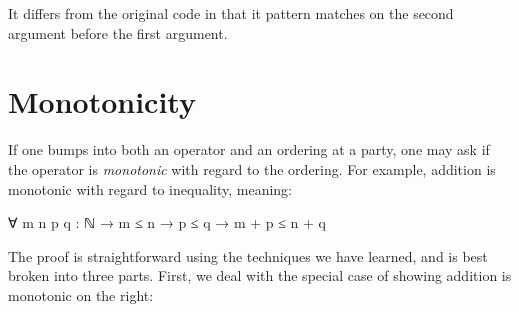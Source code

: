 It differs from the original code in that it pattern matches on the
second argument before the first argument.

\hypertarget{monotonicity}{%
\section{Monotonicity}\label{monotonicity}}

If one bumps into both an operator and an ordering at a party, one may
ask if the operator is \emph{monotonic} with regard to the ordering. For
example, addition is monotonic with regard to inequality, meaning:

\begin{myDisplay}
∀ {m n p q : ℕ} → m ≤ n → p ≤ q → m + p ≤ n + q
\end{myDisplay}

The proof is straightforward using the techniques we have learned, and
is best broken into three parts. First, we deal with the special case of
showing addition is monotonic on the right:

\begin{fence}
\begin{code}%
\>[0]\AgdaSpace{}%
\AgdaSymbol{:}\AgdaSpace{}%
\AgdaSpace{}%
\AgdaSymbol{(}\AgdaSpace{}%
\AgdaSpace{}%
\AgdaSpace{}%
\AgdaSymbol{:}\AgdaSpace{}%
\AgdaSymbol{)}\<%
\\
\>[0][@{}l@{\AgdaIndent{0}}]%
\>[2]%
\>[418I]\AgdaSpace{}%
\AgdaSpace{}%
\<%
\\
\>[.][@{}l@{}]\<[418I]%
\>[4]\AgdaComment{-------------}\<%
\\
%
\>[2]\AgdaSpace{}%
\AgdaSpace{}%
\AgdaOperator{\AgdaPrimitive{+}}\AgdaSpace{}%
\AgdaSpace{}%
\AgdaSpace{}%
\AgdaSpace{}%
\AgdaOperator{\AgdaPrimitive{+}}\AgdaSpace{}%
\<%
\\
\>[0]\AgdaSpace{}%
%
\>[18]\AgdaSpace{}%
\AgdaSpace{}%
%
\>[27]\AgdaSymbol{=}%
\>[30]\<%
\\
\>[0]\AgdaSpace{}%
\AgdaSymbol{(}\AgdaSpace{}%
\AgdaSymbol{)}\AgdaSpace{}%
\AgdaSpace{}%
\AgdaSpace{}%
%
\>[27]\AgdaSymbol{=}%
\>[30]\AgdaSpace{}%
\AgdaSymbol{(}\AgdaSpace{}%
\AgdaSpace{}%
\AgdaSpace{}%
\AgdaSpace{}%
\AgdaSymbol{)}\<%
\end{code}
\end{fence}

